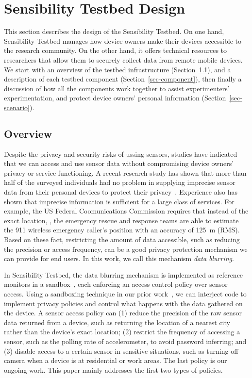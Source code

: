 \section{Sensibility Testbed Design}\label{sec-design}

This section describes the design of the Sensibility Testbed. On one
hand, Sensibility Testbed manages how device owners make their
devices accessible to the research community. On the other hand,
it offers technical resources to researchers that allow them to
securely collect data from remote mobile devices. We start with  
an overview of the testbed infrastructure (Section~\ref{sec-overview}), 
and a description of each testbed component 
(Section~\ref{sec-component}), then finally a discussion of how all the 
components work together to assist experimenters' experimentation,
and protect device owners' personal information 
(Section~\ref{sec-scenario}).

\subsection{Overview}\label{sec-overview}

Despite the privacy and security risks of ussing sensors, 
studies have indicated that we can access and use sensor data 
without compromising device owners' privacy or service functioning.
A recent research study has shown that more than half of the 
surveyed individuals had no problem in supplying imprecise 
sensor data from their personal devices to protect their 
privacy~\cite{fawaz2014location}. Experience also has shown 
that imprecise information is sufficient for a large class of 
services. For example, the US Federal Coomunications 
Commission requires that instead of the exact location, , the 
emergency rescue and response teams are able to estimate the 911 
wireless emergency caller's position with an accuracy of 125~m 
(RMS). Based on these fact, restricting 
the amount of data accessible, such as reducing the precision or 
access frequency, can be a good privacy protection mechanism we can 
provide for end users. In this work, we call this mechanism 
\textit{data blurring}.

In Sensibility Testbed, the data blurring 
mechanism is implemented as reference monitors in a 
sandbox~\cite{ref}, each enforcing an access control 
policy over sensor access. Using a sandboxing 
technique in our prior work~\cite{cappos2010retaining}, we can 
interject code to implement privacy policies and control what 
happens with the data gathered on the device. A sensor access 
policy can (1) reduce 
the precision of the raw sensor data returned from a device, such
as returning the location of a nearest city rather than the device's exact location; (2) restrict 
the frequency of accessing a sensor, such as the polling rate of 
accelerometer, to avoid password inferring; and (3) disable  
access to a certain sensor in sensitive situations, such as 
turning off camera when a device is at residential or work areas.
The last policy is our ongoing work. This paper mainly addresses
the first two types of policies. 

